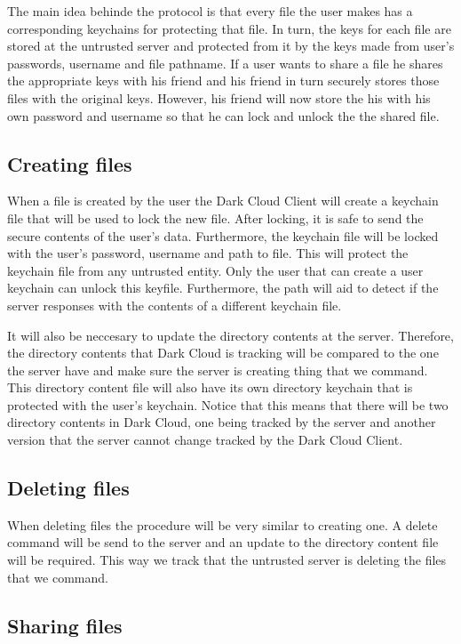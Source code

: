 \documentclass[a4paper]{article}
\begin{document}
The main idea behinde the protocol is that every file the user makes has a corresponding keychains for protecting that file. In turn, the keys for each file are stored at the untrusted server and protected from it by the keys made from user's passwords, username and file pathname. If a user wants to share a file he shares the appropriate keys with his friend and his friend in turn securely stores those files with the original keys. However, his friend will now store the his with his own password and username so that he can lock and unlock the the shared file. 

\subsection{Creating files}

When a file is created by the user the Dark Cloud Client will create a keychain file that will be used to lock the new file. After locking, it is safe to send the secure contents of the user's data. Furthermore, the keychain file will be locked with the user's password, username and path to file. This will protect the keychain file from any untrusted entity. Only the user that can create a user keychain can unlock this keyfile. Furthermore, the path will aid to detect if the server responses with the contents of a different keychain file.

It will also be neccesary to update the directory contents at the server. Therefore, the directory contents that Dark Cloud is tracking will be compared to the one the server have and make sure the server is creating thing that we command. This directory content file will also have its own directory keychain that is protected with the user's keychain. Notice that this means that there will be two directory contents in Dark Cloud, one being tracked by the server and another version that the server cannot change tracked by the Dark Cloud Client.

\subsection{Deleting files}

When deleting files the procedure will be very similar to creating one. A delete command will be send to the server and an update to the directory content file will be required. This way we track that the untrusted server is deleting the files that we command.

\subsection{Sharing files}
\end{document}
